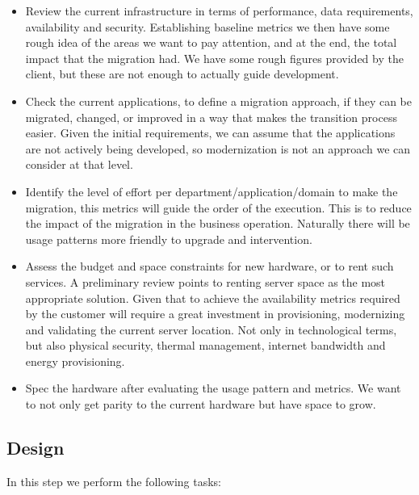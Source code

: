 \documentclass{llncs}
\begin{document}
\begin{itemize}

  \item Review the current infrastructure in terms of performance, data requirements, availability and security. Establishing baseline metrics we then have some rough idea of the areas we want to pay attention, and  at the end, the total impact that the migration had. We have some rough figures provided by the client, but these are not enough to actually guide development.
  \item Check the current applications, to define a migration approach, if they can be migrated, changed, or improved in a way that makes the transition process easier. Given the initial requirements, we can assume that the applications are not actively being developed, so modernization is not an approach we can consider at that level.
  \item Identify the level of effort per department/application/domain to make the migration, this metrics will guide the order of the execution. This is to reduce the impact of the migration in the business operation. Naturally there will be usage patterns more friendly to upgrade and intervention.
  \item Assess the budget and space constraints for new hardware, or to rent such services. A preliminary review points to renting server space as the most appropriate solution. Given that to achieve the availability metrics required by the customer will require a great investment in provisioning, modernizing and validating the current server location. Not only in technological terms, but also physical security, thermal management, internet bandwidth and energy provisioning.
  \item Spec the hardware after evaluating the usage pattern and metrics. We want to not only get parity to the current hardware but have space to grow.
\end{itemize}

\subsection{Design}

In this step we perform the following tasks:
\end{document}

